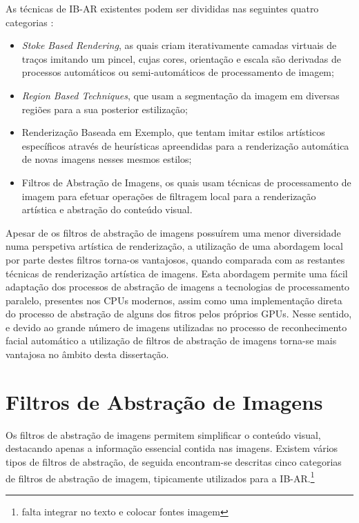 As técnicas de IB-AR existentes podem ser divididas nas seguintes quatro categorias \cite{Kyprianidis2012}:
\begin{itemize}
\item \textit{Stoke Based Rendering}, as quais criam iterativamente camadas virtuais de traços imitando um pincel, cujas cores, orientação e escala são derivadas de processos automáticos ou semi-automáticos de processamento de imagem; 
\item \textit{Region Based Techniques}, que usam a segmentação da imagem em diversas regiões para a sua posterior estilização;
\item Renderização Baseada em Exemplo, que tentam imitar estilos artísticos específicos através de heurísticas apreendidas para a renderização automática de novas imagens nesses mesmos estilos;
\item Filtros de Abstração de Imagens, os quais usam técnicas de processamento de imagem para efetuar operações de filtragem local para a renderização artística e abstração  do conteúdo visual.
\end{itemize}

Apesar de os filtros de abstração de imagens possuírem uma menor diversidade numa perspetiva artística de renderização, a utilização de uma abordagem local por parte destes filtros torna-os vantajosos, quando comparada com as restantes técnicas de renderização artística de imagens. Esta abordagem permite uma fácil adaptação dos processos de abstração de imagens a tecnologias de processamento paralelo, presentes nos CPUs modernos, assim como uma implementação direta do processo de abstração de alguns dos fitros pelos próprios GPUs. Nesse sentido, e devido ao grande número de imagens utilizadas no processo de reconhecimento facial automático a utilização de filtros de abstração de imagens torna-se mais vantajosa no âmbito desta dissertação.

\section{Filtros de Abstração de Imagens}
Os filtros de abstração de imagens permitem simplificar o conteúdo visual, destacando apenas a informação essencial contida nas imagens. Existem vários tipos de filtros de abstração, de seguida encontram-se descritas cinco categorias de filtros de abstração de imagem, tipicamente utilizados para a IB-AR.\footnote{falta integrar no texto e colocar fontes imagem}

